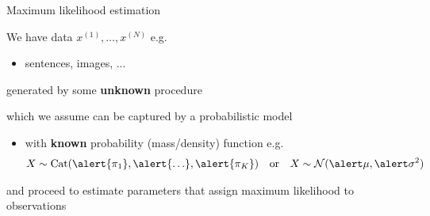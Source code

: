 \documentclass[14pt]{beamer}
\begin{document}
\begin{frame}{Maximum likelihood estimation}

\small

We have data $x^{(1)}, \ldots, x^{(N)}$ e.g.  \\
\begin{itemize}
	\item sentences, images, ...
\end{itemize}
generated by some {\bf unknown} procedure

\pause

which we assume can be captured by a probabilistic model



\begin{itemize}
	\item with {\bf known} probability (mass/density) function e.g.
	\begin{align*}
    X \sim \Cat(\alert{\pi_1}, \alert{\ldots}, \alert{\pi_K}) & & \text{or} & & X \sim \mathcal N(\alert\mu, \alert\sigma^2)
    \end{align*}    
\end{itemize}
\pause
and proceed to \alert{estimate parameters} that assign maximum likelihood to observations

\end{frame}
\end{document}

